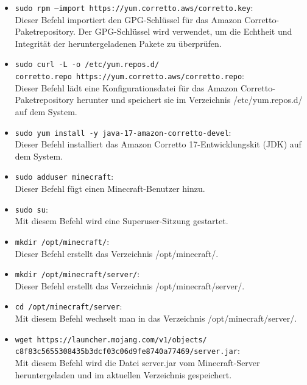 \documentclass{article}
\begin{document}
\begin{itemize}

\item \texttt{sudo rpm --import https://yum.corretto.aws/corretto.key}: \\ 
Dieser Befehl importiert den GPG-Schlüssel für das Amazon Corretto-Paketrepository. Der GPG-Schlüssel wird verwendet, um die Echtheit und Integrität der heruntergeladenen Pakete zu überprüfen.

\item \texttt{sudo curl -L -o /etc/yum.repos.d/\\corretto.repo https://yum.corretto.aws/corretto.repo}: \\ 
Dieser Befehl lädt eine Konfigurationsdatei für das Amazon Corretto-Paketrepository herunter und speichert sie im Verzeichnis /etc/yum.repos.d/ auf dem System.


\item \texttt{sudo yum install -y java-17-amazon-corretto-devel}: \\ 
Dieser Befehl installiert das Amazon Corretto 17-Entwicklungskit (JDK) auf dem System.

\item \texttt{sudo adduser minecraft}: \\ 
Dieser Befehl fügt einen Minecraft-Benutzer hinzu.

\item \texttt{sudo su}: \\ 
Mit diesem Befehl wird eine Superuser-Sitzung gestartet.

\item \texttt{mkdir /opt/minecraft/}: \\ 
Dieser Befehl erstellt das Verzeichnis /opt/minecraft/.

\item \texttt{mkdir /opt/minecraft/server/}: \\ 
Dieser Befehl erstellt das Verzeichnis /opt/minecraft/server/.

\item \texttt{cd /opt/minecraft/server}: \\ 
Mit diesem Befehl wechselt man in das Verzeichnis /opt/minecraft/server/.

\item \texttt{wget https://launcher.mojang.com/v1/objects/\\c8f83c5655308435b3dcf03c06d9fe8740a77469/server.jar}: \\ 
Mit diesem Befehl wird die Datei server.jar vom Minecraft-Server heruntergeladen und im aktuellen Verzeichnis gespeichert.


\end{itemize}
\end{document}
